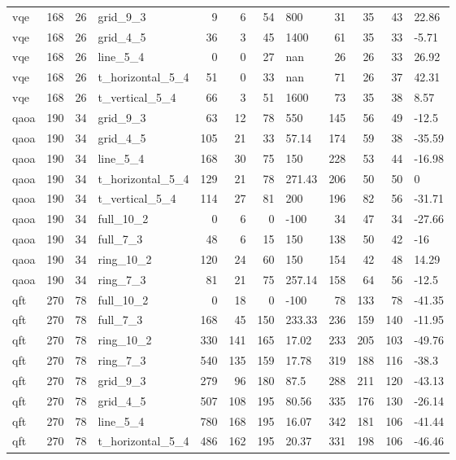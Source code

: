 \begin{longtable}{lrrlrrrlrrrl}
vqe & 168 & 26 & grid\_9\_3 & 9 & 6 & 54 & 800 & 31 & 35 & 43 & 22.86 \\
vqe & 168 & 26 & grid\_4\_5 & 36 & 3 & 45 & 1400 & 61 & 35 & 33 & -5.71 \\
vqe & 168 & 26 & line\_5\_4 & 0 & 0 & 27 & nan & 26 & 26 & 33 & 26.92 \\
vqe & 168 & 26 & t\_horizontal\_5\_4 & 51 & 0 & 33 & nan & 71 & 26 & 37 & 42.31 \\
vqe & 168 & 26 & t\_vertical\_5\_4 & 66 & 3 & 51 & 1600 & 73 & 35 & 38 & 8.57 \\
qaoa & 190 & 34 & grid\_9\_3 & 63 & 12 & 78 & 550 & 145 & 56 & 49 & -12.5 \\
qaoa & 190 & 34 & grid\_4\_5 & 105 & 21 & 33 & 57.14 & 174 & 59 & 38 & -35.59 \\
qaoa & 190 & 34 & line\_5\_4 & 168 & 30 & 75 & 150 & 228 & 53 & 44 & -16.98 \\
qaoa & 190 & 34 & t\_horizontal\_5\_4 & 129 & 21 & 78 & 271.43 & 206 & 50 & 50 & 0 \\
qaoa & 190 & 34 & t\_vertical\_5\_4 & 114 & 27 & 81 & 200 & 196 & 82 & 56 & -31.71 \\
qaoa & 190 & 34 & full\_10\_2 & 0 & 6 & 0 & -100 & 34 & 47 & 34 & -27.66 \\
qaoa & 190 & 34 & full\_7\_3 & 48 & 6 & 15 & 150 & 138 & 50 & 42 & -16 \\
qaoa & 190 & 34 & ring\_10\_2 & 120 & 24 & 60 & 150 & 154 & 42 & 48 & 14.29 \\
qaoa & 190 & 34 & ring\_7\_3 & 81 & 21 & 75 & 257.14 & 158 & 64 & 56 & -12.5 \\
qft & 270 & 78 & full\_10\_2 & 0 & 18 & 0 & -100 & 78 & 133 & 78 & -41.35 \\
qft & 270 & 78 & full\_7\_3 & 168 & 45 & 150 & 233.33 & 236 & 159 & 140 & -11.95 \\
qft & 270 & 78 & ring\_10\_2 & 330 & 141 & 165 & 17.02 & 233 & 205 & 103 & -49.76 \\
qft & 270 & 78 & ring\_7\_3 & 540 & 135 & 159 & 17.78 & 319 & 188 & 116 & -38.3 \\
qft & 270 & 78 & grid\_9\_3 & 279 & 96 & 180 & 87.5 & 288 & 211 & 120 & -43.13 \\
qft & 270 & 78 & grid\_4\_5 & 507 & 108 & 195 & 80.56 & 335 & 176 & 130 & -26.14 \\
qft & 270 & 78 & line\_5\_4 & 780 & 168 & 195 & 16.07 & 342 & 181 & 106 & -41.44 \\
qft & 270 & 78 & t\_horizontal\_5\_4 & 486 & 162 & 195 & 20.37 & 331 & 198 & 106 & -46.46 \\

\end{longtable}
